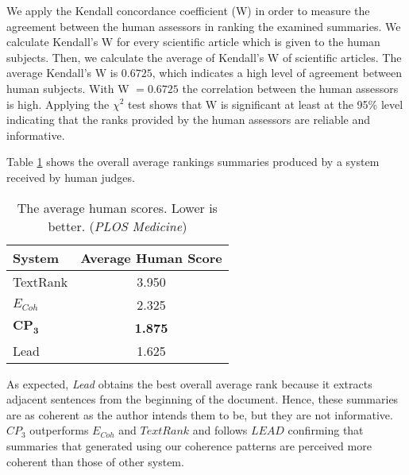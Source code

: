 We apply the Kendall concordance coefficient (W) \cite{siegel88} in order to measure the agreement between the human assessors in ranking the examined summaries. 
We calculate Kendall's W for every scientific article which is given to the human subjects. 
Then, we calculate the average of Kendall's W of scientific articles. 
The average Kendall's W is $0.6725$,  which indicates a high level of agreement between human subjects.
With W $= 0.6725$ the correlation between the human assessors is high. 
Applying the $\chi^2$ test shows that W is significant at least at the 95\% level indicating that the ranks provided by the human assessors are reliable and informative.

Table \ref{table:coherence_assessment} shows the overall average rankings summaries produced by a system received by human judges. 

\begin{table}[!ht]
\centering
\small
\begin{tabular}{l|c}
\hline
System &  Average Human Score\\
\hline
TextRank & 3.950\\
$E_{Coh}$ & 2.325\\
$\mathbf{CP_3}$ & \textbf{1.875} \\
Lead & 1.625\\
\hline
\end{tabular}
\caption{The average human scores. Lower is better. (\emph{PLOS Medicine}) }
\label{table:coherence_assessment}
\end{table}

As expected, \emph{Lead} obtains the best overall average rank because it extracts adjacent sentences from the beginning of the document. 
Hence, these summaries are as coherent as the author intends them to be, but they are not informative.
\emph{$CP_3$} outperforms $E_{Coh}$ and $TextRank$ and follows $LEAD$ confirming that summaries that generated using our coherence patterns are perceived more coherent than those of other system. 



